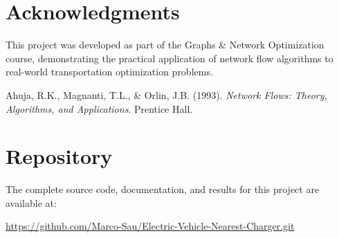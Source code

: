 \documentclass[12pt,a4paper]{article}
\begin{document}
\section*{Acknowledgments}

This project was developed as part of the Graphs \& Network Optimization course, demonstrating the practical application of network flow algorithms to real-world transportation optimization problems.


\begin{thebibliography}{9}

Ahuja, R.K., Magnanti, T.L., \& Orlin, J.B. (1993). \textit{Network Flows: Theory, Algorithms, and Applications}. Prentice Hall.

\end{thebibliography}

\section*{Repository}

The complete source code, documentation, and results for this project are available at:

\url{https://github.com/Marco-Sau/Electric-Vehicle-Nearest-Charger.git}
\end{document}
